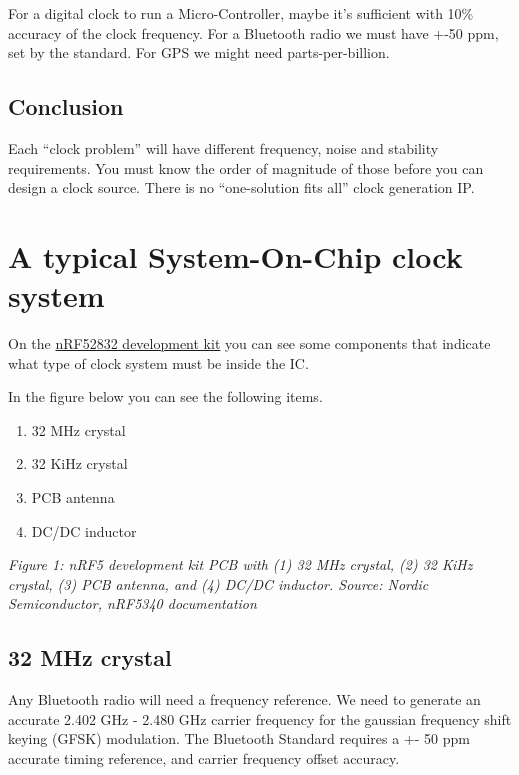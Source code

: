 For a digital clock to run a Micro-Controller, maybe it's sufficient
with 10\% accuracy of the clock frequency. For a Bluetooth radio we must
have +-50 ppm, set by the standard. For GPS we might need
parts-per-billion.

\subsection{Conclusion}\label{conclusion}

Each ``clock problem'' will have different frequency, noise and
stability requirements. You must know the order of magnitude of those
before you can design a clock source. There is no ``one-solution fits
all'' clock generation IP.

\section{A typical System-On-Chip clock
system}\label{a-typical-system-on-chip-clock-system}

On the
\href{https://www.nordicsemi.com/Products/Development-hardware/nrf52-dk}{nRF52832
development kit} you can see some components that indicate what type of
clock system must be inside the IC.

In the figure below you can see the following items.

\begin{enumerate}
\def\labelenumi{\arabic{enumi}.}
\tightlist
\item
  32 MHz crystal
\item
  32 KiHz crystal
\item
  PCB antenna
\item
  DC/DC inductor
\end{enumerate}


{
\centering
{}
}

\emph{Figure 1: nRF5 development kit PCB with (1) 32 MHz crystal, (2) 32
KiHz crystal, (3) PCB antenna, and (4) DC/DC inductor. Source: Nordic
Semiconductor, nRF5340 documentation}

\subsection{32 MHz crystal}\label{mhz-crystal}

Any Bluetooth radio will need a frequency reference. We need to generate
an accurate 2.402 GHz - 2.480 GHz carrier frequency for the gaussian
frequency shift keying (GFSK) modulation. The Bluetooth Standard
requires a +- 50 ppm accurate timing reference, and carrier frequency
offset accuracy.

